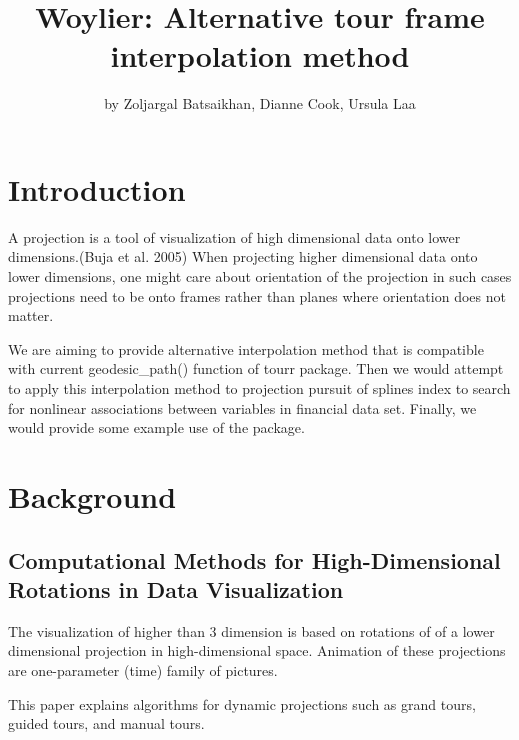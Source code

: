 \title{Woylier: Alternative tour frame interpolation method}
\author{by Zoljargal Batsaikhan, Dianne Cook, Ursula Laa}

\maketitle


\hypertarget{introduction}{%
\section{Introduction}\label{introduction}}

A projection is a tool of visualization of high dimensional data onto lower dimensions.(Buja et al. 2005) When projecting higher dimensional data onto lower dimensions, one might care about orientation of the projection in such cases projections need to be onto frames rather than planes where orientation does not matter.

We are aiming to provide alternative interpolation method that is compatible with current geodesic\_path() function of tourr package. Then we would attempt to apply this interpolation method to projection pursuit of splines index to search for nonlinear associations between variables in financial data set. Finally, we would provide some example use of the package.

\hypertarget{background}{%
\section{Background}\label{background}}

\hypertarget{computational-methods-for-high-dimensional-rotations-in-data-visualization}{%
\subsection{Computational Methods for High-Dimensional Rotations in Data Visualization}\label{computational-methods-for-high-dimensional-rotations-in-data-visualization}}

The visualization of higher than 3 dimension is based on rotations of of a lower dimensional projection in high-dimensional space. Animation of these projections are one-parameter (time) family of pictures.

This paper explains algorithms for dynamic projections such as grand tours, guided tours, and manual tours.

